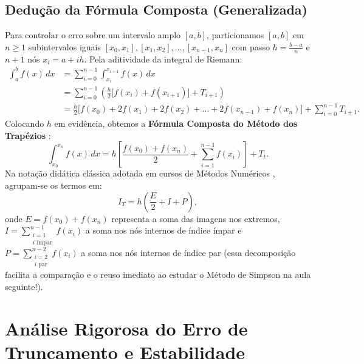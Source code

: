 \documentclass[11pt,a4paper]{article}
\begin{document}
\subsection{Dedução da Fórmula Composta (Generalizada)}
Para controlar o erro sobre um intervalo amplo $[a, b]$, particionamos $[a, b]$ em $n \ge 1$ subintervalos iguais $[x_0, x_1], [x_1, x_2], \dots, [x_{n-1}, x_n]$ com passo $h = \frac{b - a}{n}$ e $n + 1$ nós $x_i = a + i h$. Pela aditividade da integral de Riemann:
\begin{align}
    \int_{a}^{b} f(x)\,dx &= \sum_{i=0}^{n-1} \int_{x_i}^{x_{i+1}} f(x)\,dx \nonumber \\
    &= \sum_{i=0}^{n-1} \left( \frac{h}{2}\big[f(x_i) + f(x_{i+1})\big] + T_{i+1} \right) \nonumber \\
    &= \frac{h}{2}\Big[ f(x_0) + 2f(x_1) + 2f(x_2) + \dots + 2f(x_{n-1}) + f(x_n) \Big] + \sum_{i=0}^{n-1} T_{i+1}.
\end{align}
Colocando $h$ em evidência, obtemos a \textbf{Fórmula Composta do Método dos Trapézios} \cite{santos2010, mesquita2026}:
\begin{equation}
    \int_{x_0}^{x_n} f(x)\,dx = h \left[ \frac{f(x_0) + f(x_n)}{2} + \sum_{i=1}^{n-1} f(x_i) \right] + T_t.
\end{equation}
Na notação didática clássica adotada em cursos de Métodos Numéricos \cite{santos2010, mesquita2026}, agrupam-se os termos em:
\begin{equation}
    I_T = h \left( \frac{E}{2} + I + P \right),
\end{equation}
onde $E = f(x_0) + f(x_n)$ representa a soma das imagens nos extremos, $I = \sum_{\substack{i=1 \\ i \text{ ímpar}}}^{n-1} f(x_i)$ a soma nos nós internos de índice ímpar e $P = \sum_{\substack{i=2 \\ i \text{ par}}}^{n-2} f(x_i)$ a soma nos nós internos de índice par (essa decomposição facilita a comparação e o reuso imediato ao estudar o Método de Simpson na aula seguinte!).

\section{Análise Rigorosa do Erro de Truncamento e Estabilidade}
\end{document}
